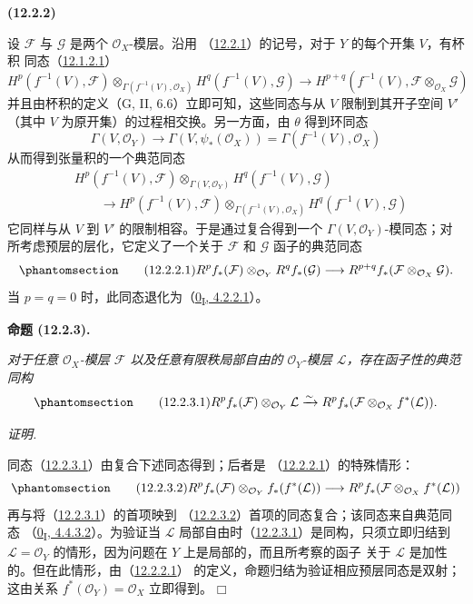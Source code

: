 \documentclass[UTF8,fontset=none,11pt,oneside,openany]{ctexbook}
\providecommand{\square}{\mdlgwhtsquare}
\newenvironment{env}[1][]{%
  \par\medskip\noindent\textbf{(#1)}\ %
}{\par}
\newenvironment{proposition}[1][]{%
  \par\medskip\noindent\textbf{命题 (#1).}\ %
}{\par}
\newenvironment{proof}{%
  \par\smallskip\noindent\textit{证明.}\ %
}{\hfill$\square$\par}
\newcommand{\oldpage}[2][]{%
  \hypertarget{ega-source-page-#1-#2}{}%
  \marginnote{\scriptsize\textbf{#1}~|~#2}\ignorespaces}
\let\EGAOriginalLabel\label
\renewcommand{\label}[1]{\phantomsection\EGAOriginalLabel{#1}}
\begin{document}
\begin{env}[12.2.2]
\label{0.12.2.2-fr}
设 $\mathcal F$ 与 $\mathcal G$ 是两个 $\mathcal O_X$-模层。沿用
（\hyperref[0.12.2.1-fr]{12.2.1}）的记号，对于 $Y$ 的每个开集 $V$，有杯积
同态（\hyperref[0.12.1.2.1-fr]{12.1.2.1}）
\[
H^p(f^{-1}(V),\mathcal F)
\otimes_{\Gamma(f^{-1}(V),\mathcal O_X)}
H^q(f^{-1}(V),\mathcal G)
\longrightarrow
H^{p+q}(f^{-1}(V),\mathcal F\otimes_{\mathcal O_X}\mathcal G)
\]
\oldpage[0\textsubscript{III}]{58}
并且由杯积的定义（G, II, 6.6）立即可知，这些同态与从 $V$ 限制到其开子空间
$V'$（其中 $V$ 为原开集）的过程相交换。另一方面，由 $\theta$ 得到环同态
\[
\Gamma(V,\mathcal O_Y)\longrightarrow\Gamma(V,\psi_*(\mathcal O_X))
=\Gamma(f^{-1}(V),\mathcal O_X)
\]
从而得到张量积的一个典范同态
\[
\begin{aligned}
&H^p(f^{-1}(V),\mathcal F)\otimes_{\Gamma(V,\mathcal O_Y)}
H^q(f^{-1}(V),\mathcal G)\\
&\qquad\longrightarrow
H^p(f^{-1}(V),\mathcal F)
\otimes_{\Gamma(f^{-1}(V),\mathcal O_X)}
H^q(f^{-1}(V),\mathcal G)
\end{aligned}
\]
它同样与从 $V$ 到 $V'$ 的限制相容。于是通过复合得到一个
$\Gamma(V,\mathcal O_Y)$-模同态；对所考虑预层的层化，它定义了一个关于
$\mathcal F$ 和 $\mathcal G$ 函子的典范同态
\[
\label{0.12.2.2.1-fr}
\tag{12.2.2.1}
R^p f_*(\mathcal F)\otimes_{\mathcal O_Y}R^q f_*(\mathcal G)
\longrightarrow
R^{p+q}f_*(\mathcal F\otimes_{\mathcal O_X}\mathcal G).
\]
当 $p=q=0$ 时，此同态退化为（\hyperref[0.4.2.2.1-fr]{0\textsubscript{I}, 4.2.2.1}）。
\end{env}
\begin{proposition}[12.2.3]
\label{0.12.2.3-fr}
\emph{对于任意 $\mathcal O_X$-模层 $\mathcal F$ 以及任意有限秩局部自由的
$\mathcal O_Y$-模层 $\mathcal L$，存在函子性的典范同构
\[
\label{0.12.2.3.1-fr}
\tag{12.2.3.1}
R^p f_*(\mathcal F)\otimes_{\mathcal O_Y}\mathcal L
\xrightarrow{\sim}
R^p f_*(\mathcal F\otimes_{\mathcal O_X}f^*(\mathcal L)).
\]}
\end{proposition}
\begin{proof}
同态（\hyperref[0.12.2.3.1-fr]{12.2.3.1}）由复合下述同态得到；后者是
（\hyperref[0.12.2.2.1-fr]{12.2.2.1}）的特殊情形：
\[
\label{0.12.2.3.2-fr}
\tag{12.2.3.2}
R^p f_*(\mathcal F)\otimes_{\mathcal O_Y}f_*(f^*(\mathcal L))
\longrightarrow
R^p f_*(\mathcal F\otimes_{\mathcal O_X}f^*(\mathcal L))
\]
再与将（\hyperref[0.12.2.3.1-fr]{12.2.3.1}）的首项映到
（\hyperref[0.12.2.3.2-fr]{12.2.3.2}）首项的同态复合；该同态来自典范同态
（\hyperref[0.4.4.3.2-fr]{0\textsubscript{I}, 4.4.3.2}）。为验证当 $\mathcal L$
局部自由时（\hyperref[0.12.2.3.1-fr]{12.2.3.1}）是同构，只须立即归结到
$\mathcal L=\mathcal O_Y$ 的情形，因为问题在 $Y$ 上是局部的，而且所考察的函子
关于 $\mathcal L$ 是加性的。但在此情形，由（\hyperref[0.12.2.2.1-fr]{12.2.2.1}）
的定义，命题归结为验证相应预层同态是双射；这由关系
$f^*(\mathcal O_Y)=\mathcal O_X$ 立即得到。
\end{proof}
\end{document}
